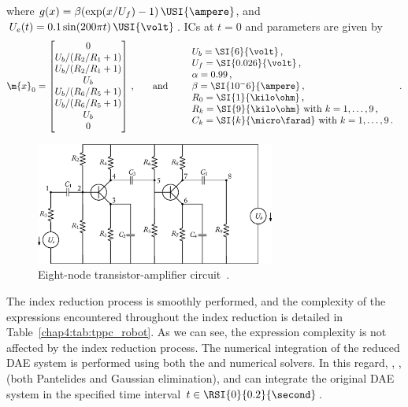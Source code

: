 %
where $g(x) = \beta(\exp(x/U_f) - 1)\,\USI{\ampere}$, and $U_e(t) = 0.1\sin(200 \pi t)\,\USI{\volt}$. \acp{IC} at $t = 0$ and parameters are given by
%
\begin{equation*}
  \m{x}_0 = \begin{bmatrix}
    0 \\
    U_b/(R_2/R_1 + 1) \\
    U_b/(R_2/R_1 + 1) \\
    U_b \\
    U_b/(R_6/R_5 + 1) \\
    U_b/(R_6/R_5 + 1) \\
    U_b \\
    0 \\
  \end{bmatrix} \, \text{,}
  \qquad \text{and} \qquad
  \begin{array}{l}
    U_b = \SI{6}{\volt} \, \text{,} \\
    U_f = \SI{0.026}{\volt} \, \text{,} \\
    \alpha = 0.99 \, \text{,} \\
    \beta = \SI{10^-6}{\ampere} \, \text{,} \\
    R_0 = \SI{1}{\kilo\ohm} \, \text{,} \\
    R_k = \SI{9}{\kilo\ohm} ~ \text{with} ~ k=1, \dots, 9 \, \text{,} \\
    C_k = \SI{k}{\micro\farad} ~ \text{with} ~ k=1, \dots, 9 \, \text{.} \\
  \end{array} \, \text{.}
\end{equation*}

\begin{figure}
  \centering
  \includegraphics[width=0.7\textwidth]{figures/chapter_4/transistor_amplifier.eps}
  \caption{Eight-node transistor-amplifier circuit~\cite{lioen1998test, mazzia2008test}.}
  \label{chap4:fig:transistor_amplifier}
\end{figure}

The index reduction process is smoothly performed, and the complexity of the expressions encountered throughout the index reduction is detailed in Table~\ref{chap4:tab:tppc_robot}. As we can see, the expression complexity is not affected by the index reduction process. The numerical integration of the reduced \ac{DAE} system is performed using both the \Maple{} and \Indigo{} numerical solvers. In this regard, \Maple{}, \Mathematica{}, \Matlab{} (both Pantelides and Gaussian elimination), and \Indigo{} can integrate the original \ac{DAE} system in the specified time interval $t \in \RSI{0}{0.2}{\second}$.

